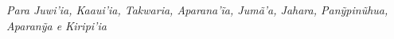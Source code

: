 \chapter*{}

\vspace*{\fill}

{ \raggedleft


\hfill{\textit{Para Juwi'ia, Kaaui'ia, Takwaria, Aparana'ĩa, Jumã'a, Jahara,
Panỹpinũhua, Aparanỹa e Kiripi'ia}}

}

\thispagestyle{empty}




